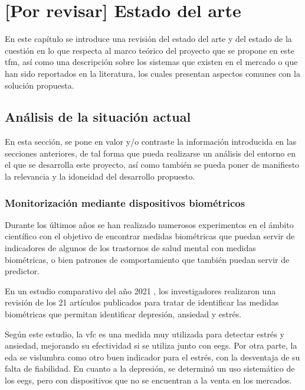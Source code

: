\chapter{[Por revisar] Estado del arte}
\label{chapter:estado_arte}



En este capítulo se introduce una revisión del estado del arte y del estado de la cuestión en lo que respecta al marco teórico del proyecto que se propone en este \gls{tfm}, así como una descripción sobre los sistemas que existen en el mercado o que han sido reportados en la literatura, los cuales presentan aspectos comunes con la solución propuesta.

\section{Análisis de la situación actual}

    En esta sección, se pone en valor y/o contraste la información introducida en las secciones anteriores, de tal forma que pueda realizarse un análisis del entorno en el que se desarrolla este proyecto, así como también se pueda poner de manifiesto la relevancia y la idoneidad del desarrollo propuesto. 
    
    \subsection{Monitorización mediante dispositivos biométricos}
        \label{sec:estado_arte:biometricos}

        Durante los últimos años se han realizado numerosos experimentos en el ámbito científico con el objetivo de encontrar medidas biométricas que puedan servir de indicadores de algunos de los trastornos de salud mental con medidas biométricas, o bien patrones de comportamiento que también puedan servir de predictor.

        En un estudio comparativo del año 2021 \cite{hickey_smart_2021}, los investigadores realizaron una revisión de los 21 artículos publicados para tratar de identificar las medidas biométricas que permitan identificar depresión, ansiedad y estrés.

        Según este estudio, la \gls{vfc} es una medida muy utilizada para detectar estrés y ansiedad, mejorando su efectividad si se utiliza junto con \glspl{eeg}. Por otra parte, la \gls{eda} se vislumbra como otro buen indicador para el estrés, con la desventaja de su falta de fiabilidad. En cuanto a la depresión, se determinó un uso sistemático de los \glspl{eeg}, pero con dispositivos que no se encuentran a la venta en los mercados.

